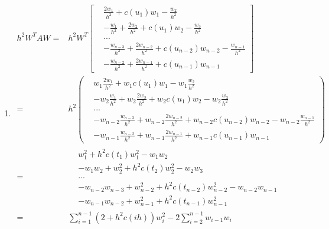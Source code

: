 \documentclass[12pt, letterpaper]{article}
\begin{document}
\begin{enumerate}
  \item
    \begin{equation*}
      \begin{split}
        h^2 W^T A W = & h^2 W^T \left[
        \begin{split}
          & \frac{2 w_1}{h^2} + c(u_1) w_1 - \frac{w_2}{h^2} \\
          & - \frac{w_1}{h^2} + \frac{2 w_2}{h^2} + c(u_1) w_2 -
          \frac{w_3}{h^2} \\
          & ... \\
          & - \frac{w_{n-3}}{h^2} + \frac{2 w_{n-2}}{h^2} + c(u_{n-2})
          w_{n-2} - \frac{w_{n-1}}{h^2} \\
          & - \frac{w_{n-2}}{h^2} + \frac{2 w_{n-1}}{h^2} + c(u_{n-1}) w_{n-1}
        \end{split}
        \right] \\
        = & h^2 \left(
        \begin{split}
          & w_1 \frac{2 w_1}{h^2} + w_1 c(u_1) w_1 - w_1 \frac{w_2}{h^2} \\
          & - w_2 \frac{w_1}{h^2} + w_2 \frac{2 w_2}{h^2} + w_2 c(u_1) w_2 -
          w_2 \frac{w_3}{h^2} \\
          & ... \\
          & - w_{n-2} \frac{w_{n-3}}{h^2} + w_{n-2} \frac{2
            w_{n-2}}{h^2} + w_{n-2} c(u_{n-2})
          w_{n-2} - w_{n-2} \frac{w_{n-1}}{h^2} \\
          & - w_{n-1} \frac{w_{n-2}}{h^2} + w_{n-1} \frac{2
            w_{n-1}}{h^2} + w_{n-1} c(u_{n-1}) w_{n-1}
        \end{split}
        \right) \\
        = & 
        \begin{split}
          & w_1^2 + h^2 c(t_1) w_1^2 - w_1 w_2 \\
          & - w_1 w_2 + w_2^2 + h^2 c(t_2) w_2^2 -
          w_2 w_3 \\
          & ... \\
          & - w_{n-2} w_{n-3} + w_{n-2}^2 + h^2 c(t_{n-2}) w_{n-2}^2
          - w_{n-2} w_{n-1} \\
          & - w_{n-1} w_{n-2} + w_{n-1}^2 + h^2 c(t_{n-1}) w_{n-1}^2
        \end{split}
        \\
        = & \sum_{i=1}^{n-1} {(2 + h^2c(ih)) w_i^2} - 2 \sum_{i=2}^{n-1} {w_{i-1}w_i}
      \end{split}
    \end{equation*}


\end{enumerate}
\end{document}
